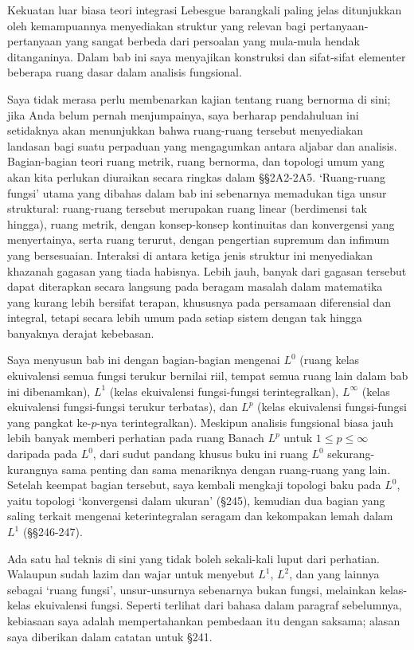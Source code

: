 
\def\chaptername{Ruang fungsi}
\def\sectionname{Pendahuluan}


Kekuatan luar biasa teori integrasi Lebesgue barangkali paling jelas
ditunjukkan oleh kemampuannya menyediakan struktur yang relevan bagi
pertanyaan-pertanyaan yang sangat berbeda dari persoalan yang mula-mula
hendak ditanganinya. Dalam bab ini saya menyajikan konstruksi dan sifat-sifat
elementer beberapa ruang dasar dalam analisis fungsional.

Saya tidak merasa perlu membenarkan kajian tentang ruang bernorma di sini;
jika Anda belum pernah menjumpainya, saya berharap pendahuluan ini setidaknya
akan menunjukkan bahwa ruang-ruang tersebut menyediakan landasan bagi suatu
perpaduan yang mengagumkan antara aljabar dan analisis. Bagian-bagian teori
ruang metrik, ruang bernorma, dan topologi umum yang akan kita perlukan
diuraikan secara ringkas dalam \S\S2A2-2A5.  %
`Ruang-ruang fungsi' utama yang dibahas dalam bab ini sebenarnya memadukan
tiga unsur struktural: ruang-ruang tersebut merupakan ruang linear
(berdimensi tak hingga), ruang metrik, dengan konsep-konsep kontinuitas dan
konvergensi yang menyertainya, serta ruang terurut, dengan pengertian
supremum dan infimum yang bersesuaian. Interaksi di antara ketiga jenis
struktur ini menyediakan khazanah gagasan yang tiada habisnya. Lebih jauh,
banyak dari gagasan tersebut dapat diterapkan secara langsung pada beragam
masalah dalam matematika yang kurang lebih bersifat terapan, khususnya pada
persamaan diferensial dan integral, tetapi secara lebih umum pada setiap
sistem dengan tak hingga banyaknya derajat kebebasan.

Saya menyusun bab ini dengan bagian-bagian mengenai $L^0$ (ruang kelas
ekuivalensi semua fungsi terukur bernilai riil, tempat semua ruang lain dalam
bab ini dibenamkan), $L^1$ (kelas ekuivalensi fungsi-fungsi terintegralkan),
$L^{\infty}$ (kelas ekuivalensi fungsi-fungsi terukur terbatas), dan $L^p$
(kelas ekuivalensi fungsi-fungsi yang pangkat ke-$p$-nya terintegralkan).
Meskipun analisis fungsional biasa jauh lebih banyak memberi perhatian pada
ruang Banach $L^p$ untuk $1\le p\le\infty$ daripada pada $L^0$, dari sudut
pandang khusus buku ini ruang $L^0$ sekurang-kurangnya sama penting dan sama
menariknya dengan ruang-ruang yang lain. Setelah keempat bagian tersebut,
saya kembali mengkaji topologi baku pada $L^0$, yaitu topologi `konvergensi
dalam ukuran' (\S245), kemudian dua bagian yang saling terkait mengenai
keterintegralan seragam dan kekompakan lemah dalam $L^1$ (\S\S246-247).

Ada satu hal teknis di sini yang tidak boleh sekali-kali luput dari perhatian.
Walaupun sudah lazim dan wajar untuk menyebut $L^1$, $L^2$, dan yang lainnya
sebagai `ruang fungsi', unsur-unsurnya sebenarnya bukan fungsi, melainkan
kelas-kelas ekuivalensi fungsi. Seperti terlihat dari bahasa dalam paragraf
sebelumnya, kebiasaan saya adalah mempertahankan pembedaan itu dengan
saksama; alasan saya diberikan dalam catatan untuk \S241.

\discrpage


